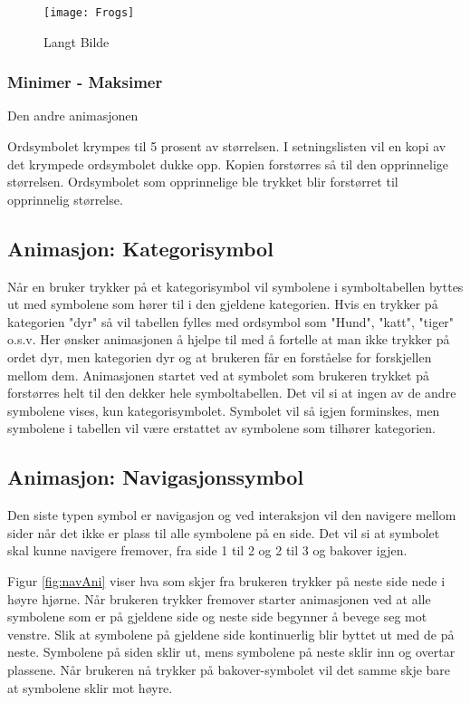  
 \begin{figure}
 \centering
 \texttt{[image: Frogs]}
 \caption{Langt Bilde}
 \label{fig:OrdAnimasjon}
 \end{figure}


\subsubsection{Minimer - Maksimer}

Den andre animasjonen 

   Ordsymbolet krympes til 5 prosent av størrelsen. 
   I setningslisten vil en kopi av det krympede ordsymbolet dukke opp. 
   Kopien forstørres så til den opprinnelige størrelsen. 
   Ordsymbolet som opprinnelige ble trykket blir forstørret til opprinnelig størrelse. 
 

\subsection{Animasjon: Kategorisymbol} 
 
 
Når en bruker trykker på et kategorisymbol vil symbolene i symboltabellen byttes ut med symbolene som hører til i den gjeldene kategorien. Hvis en trykker på kategorien "dyr" så vil tabellen fylles med ordsymbol som "Hund", "katt", "tiger" o.s.v. Her ønsker animasjonen å hjelpe til med å fortelle at man ikke trykker på ordet dyr, men kategorien dyr og at brukeren får en forståelse for forskjellen mellom dem. Animasjonen startet ved at symbolet som brukeren trykket på forstørres helt til den dekker hele symboltabellen. Det vil si at ingen av de andre symbolene vises, kun kategorisymbolet. Symbolet vil så igjen forminskes, men symbolene i tabellen vil være erstattet av symbolene som tilhører kategorien.  
 
 
 
 
\subsection{Animasjon: Navigasjonssymbol} 
 
 
Den siste typen symbol er navigasjon og ved interaksjon vil den navigere mellom sider når det ikke er plass til alle symbolene på en side. Det vil si at symbolet skal kunne navigere fremover, fra side 1 til 2 og 2 til 3 og bakover igjen. 

Figur \ref{fig:navAni} viser hva som skjer fra brukeren trykker på neste side nede i høyre hjørne. Når brukeren trykker fremover starter animasjonen ved at alle symbolene som er på gjeldene side og neste side begynner å bevege seg mot venstre. Slik at symbolene på gjeldene side kontinuerlig blir byttet ut med de på neste. Symbolene på siden sklir ut, mens symbolene på neste sklir inn og overtar plassene. Når brukeren nå trykker på bakover-symbolet vil det samme skje bare at symbolene sklir mot høyre. 
 

